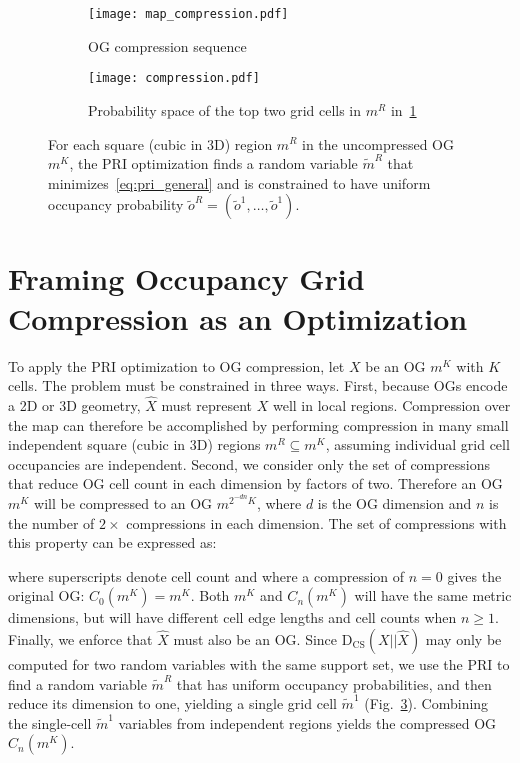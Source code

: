 \begin{figure}
    \centering
    \begin{subfigure}[t]{0.45\textwidth}
        \centering
        \texttt{[image: map\_compression.pdf]}
        \caption{OG compression sequence \label{fig:pri_compression1}}
    \end{subfigure}
    \hfill
    \begin{subfigure}[t]{0.45\textwidth}
        \centering
        \texttt{[image: compression.pdf]}
        \caption{Probability space of the top two grid cells in $m^{R}$ in~\ref{fig:pri_compression1} \label{fig:pri_compression2}}
    \end{subfigure}
    \caption{For each square (cubic in 3D) region $m^{R}$ in the uncompressed OG $m^{K}$, the PRI optimization finds a random variable $\tilde{m}^{R}$ that minimizes~\eqref{eq:pri_general} and is constrained to have uniform occupancy probability $\tilde{o}^{R} = (\tilde{o}^{1}, \dots, \tilde{o}^{1})$. \label{fig:pri_compression}}
\end{figure}


\section{Framing Occupancy Grid Compression as an Optimization}

To apply the PRI optimization to OG compression, let $X$ be an OG $m^{K}$ with $K$ cells. The problem must be constrained in three ways. First, because OGs encode a 2D or 3D geometry, $\hat{X}$ must represent $X$ well in local regions. Compression over the map can therefore be accomplished by performing compression in many small independent square (cubic in 3D) regions $m^{R} \subseteq m^{K}$, assuming individual grid cell occupancies are independent.  Second, we consider only the set of compressions that reduce OG cell count in each dimension by factors of two. Therefore an OG $m^{K}$ will be compressed to an OG $m^{2^{-dn}K}$, where $d$ is the OG dimension and $n$ is the number of $2\times$ compressions in each dimension. The set of compressions with this property can be expressed as:
%

where superscripts denote cell count and where a compression of $n=0$ gives the original OG: $C_{0}(m^{K}) = m^{K}$. Both $m^{K}$ and $C_{n}(m^{K})$ will have the same metric dimensions, but will have different cell edge lengths and cell counts when $n \ge 1$. Finally, we enforce that $\hat{X}$ must also be an OG. Since $\text{D}_{\text{CS}}(X\vert \vert \hat{X})$ may only be computed for two random variables with the same support set, we use the PRI to find a random variable $\tilde{m}^{R}$ that has uniform occupancy probabilities, and then reduce its dimension to one, yielding a single grid cell $\tilde{m}^{1}$ (Fig.~\ref{fig:pri_compression}). Combining the single-cell $\tilde{m}^{1}$ variables from independent regions yields the compressed OG $C_{n}(m^{K})$.

